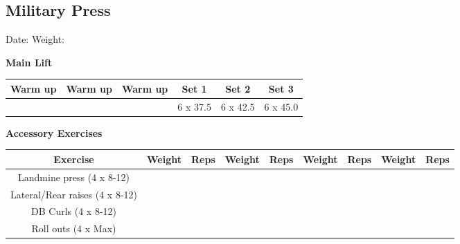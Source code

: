 \documentclass{article}%
\begin{document}
\subsection*{Military Press}%
Date: %
\linebreak%
Weight: %
\vspace*{20pt}%
\linebreak%
\begin{minipage}{0.5\textwidth}%
\textbf{Main Lift\newline%
\newline%
}%
\begin{tabular}{|c|c|c|c|c|c|}%
\hline%
Warm up&Warm up&Warm up&Set 1&Set 2&Set 3\\%
\hline%
&&&6 x 37.5&6 x 42.5&6 x 45.0\\%
\hline%
\end{tabular}%
\vspace*{20pt}%
\linebreak%
\textbf{Accessory Exercises\newline%
\newline%
}%
\begin{tabular}{|c|c|c|c|c|c|c|c|c|}%
\hline%
Exercise&Weight&Reps&Weight&Reps&Weight&Reps&Weight&Reps\\%
\hline%
Landmine press (4 x 8{-}12)&&&&&&&&\\%
\hline%
Lateral/Rear raises (4 x 8{-}12)&&&&&&&&\\%
\hline%
DB Curls (4 x 8{-}12)&&&&&&&&\\%
\hline%
Roll outs (4 x Max)&&&&&&&&\\%
\hline%
\end{tabular}%
\end{minipage}%
\vspace*{20pt}%
\linebreak

%
\end{document}
